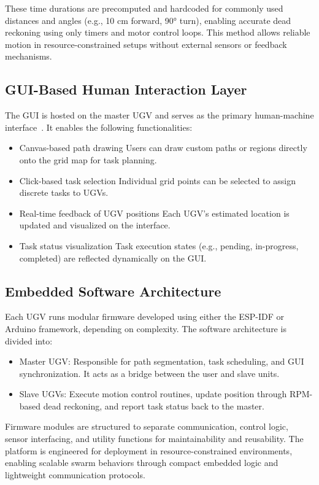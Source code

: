 \documentclass[conference]{IEEEtran}
\begin{document}
These time durations are precomputed and hardcoded for commonly used distances and angles (e.g., 10 cm forward, 90° turn), enabling accurate dead reckoning using only timers and motor control loops. This method allows reliable motion in resource-constrained setups without external sensors or feedback mechanisms.

\subsection{GUI-Based Human Interaction Layer}
\label{subsec:3.6}
The GUI is hosted on the master UGV and serves as the primary human-machine interface~\cite{randomnerd2024esp32}. It enables the following functionalities:
\begin{itemize}
    \item Canvas-based path drawing Users can draw custom paths or regions directly onto the grid map for task planning.
    \item Click-based task selection Individual grid points can be selected to assign discrete tasks to UGVs.
    \item Real-time feedback of UGV positions Each UGV's estimated location is updated and visualized on the interface.
    \item Task status visualization Task execution states (e.g., pending, in-progress, completed) are reflected dynamically on the GUI.
\end{itemize}


\subsection{Embedded Software Architecture}
Each UGV runs modular firmware developed using either the ESP-IDF or Arduino framework, depending on complexity. The software architecture is divided into:
\begin{itemize}
    \item {Master UGV:} Responsible for path segmentation, task scheduling, and GUI synchronization. It acts as a bridge between the user and slave units.
    \item {Slave UGVs:} Execute motion control routines, update position through RPM-based dead reckoning, and report task status back to the master.
\end{itemize}

Firmware modules are structured to separate communication, control logic, sensor interfacing, and utility functions for maintainability and reusability. The platform is engineered for deployment in resource-constrained environments, enabling scalable swarm behaviors through compact embedded logic and lightweight communication protocols.
\end{document}
